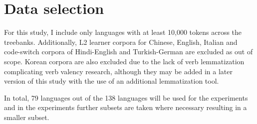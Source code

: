 

\section{Data selection}\label{sec:data_selection}

For this study, I include only languages with at least 10,000 tokens across the treebanks. Additionally, L2 learner corpora for Chinese, English, Italian and code-switch corpora of Hindi-English and Turkish-German are excluded as out of scope. Korean corpora are also excluded due to the lack of verb lemmatization complicating verb valency research, although they may be added in a later version of this study with the use of an additional lemmatization tool.

In total, 79 languages out of the 138 languages will be used for the experiments and in the experiments further subsets are taken where necessary resulting in a smaller subset.